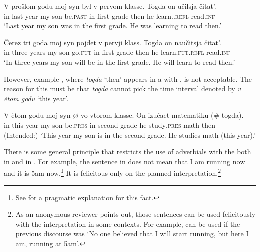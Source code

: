 \documentclass[output=paper,modfonts,newtxmath,hidelinks]{langscibook}
\begin{document}
\ea \label{20:ex7}
\gll V prošlom godu moj syn byl v pervom klasse. Togda on učilsja čitat’.\\
     in last year my son be.\textsc{past} in first grade then he learn\textsc{..refl} read.\textsc{inf}\\
\glt `Last year my son was in the first grade. He was learning to read then.'
\z

\ea \label{20:ex8}
\gll Čerez tri goda moj syn pojdet v pervji klass. Togda on naučitsja čitat’.\\
     in three years my son go.\textsc{fut} in first grade then he learn.\textsc{fut.refl} read.\textsc{inf}\\
\glt `In three years my son will be in the first grade. He will learn to read then.'
\z

\noindent However, example , where \textit{togda} ‘then’ appears in a  with , is not acceptable. The reason for this must be that \textit{togda} cannot pick the time interval denoted by \textit{v ėtom godu} ‘this year’.

\ea \label{20:ex9}
\gll V ėtom godu moj syn ${\varnothing}$ vo vtorom klasse. On izučaet matematiku (\#\hspace{-2pt} togda).\\
     in this year my son be.\textsc{pres} in second grade he study\textsc{.pres} math {} then\\
\glt (Intended:) `This year my son is in the second grade. He studies math (this year).'
\z

\noindent There is some general principle that restricts the use of adverbials with the  both in  and in . For example, the sentence in  does not mean that I am running now and it is 5am now.\footnote{\label{20:fn8}See \citet{Kamp-Reyle1993} for a pragmatic explanation for this fact.} It is felicitous only on the planned  interpretation.\footnote{\label{20:fn9}As an anonymous reviewer points out, those sentences can be used felicitously with the  interpretation in some contexts. For example,  can be used if the previous discourse was `No one believed that I will start running, but here I am, running at 5am'.}

\label{20:ex10}
\z
\end{document}
